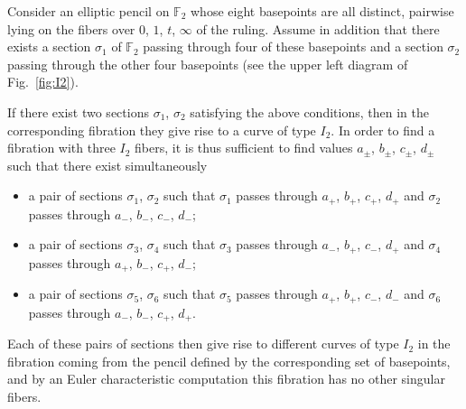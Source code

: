 \documentclass[10pt,a4paper]{amsart}
\numberwithin{equation}{section}
\begin{document}
\begin{Example}
Consider an elliptic pencil on ${\mathbb {F}}_2$ whose eight basepoints are
all distinct, pairwise lying on the fibers over $0$, $1$, $t$, $\infty $ of the
ruling. Assume in addition that there exists a section $\sigma_1$ of
${\mathbb {F}}_2$ passing through four of these basepoints and a
section $\sigma_2$ passing through the other four basepoints
(see the upper left diagram of Fig.~\ref{fig:I2}).

If there exist two sections $\sigma_1$, $\sigma_2$ satisfying the above
conditions, then in the corresponding fibration they give rise to a
curve of type $I_2$. In order to find a fibration with three
$I_2$ fibers, it is thus sufficient to find values $a_{\pm}$, $b_{\pm}$, $c_{\pm}$, $d_{\pm}$ such that there exist simultaneously
\begin{itemize}\itemsep=0pt
 \item a pair of sections $\sigma_1$, $\sigma_2$ such that $\sigma_1$
 passes through $a_+$, $b_+$, $c_+$, $d_+$ and $\sigma_2$ passes through
 $a_-$, $b_-$, $c_-$, $d_-$;
 \item a pair of sections $\sigma_3$, $\sigma_4$ such that $\sigma_3$
 passes through $a_-$, $b_+$, $c_-$, $d_+$ and $\sigma_4$ passes through $a_+$, $b_-$, $c_+$, $d_-$;
 \item a pair of sections $\sigma_5$, $\sigma_6$ such that $\sigma_5$
 passes through $a_+$, $b_+$, $c_-$, $d_-$ and $\sigma_6$ passes through $a_-$, $b_-$, $c_+$, $d_+$.
\end{itemize}
Each of these pairs of sections then give rise to different curves of type $I_2$ in the fibration coming
from the pencil defined by the corresponding set of basepoints, and by an Euler characteristic computation
this fibration has no other singular fibers.


\end{Example}
\end{document}
